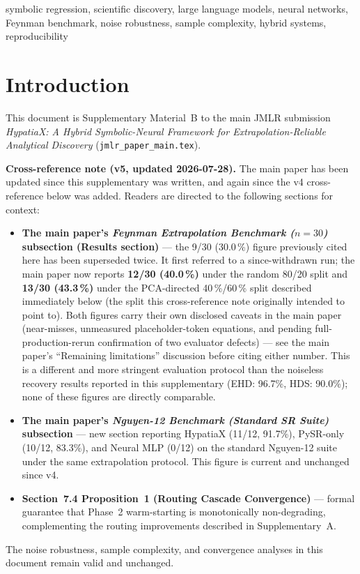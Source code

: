 \documentclass[twoside,11pt]{article}
\begin{document}
\begin{keywords}
symbolic regression, scientific discovery, large language models,
neural networks, Feynman benchmark, noise robustness, sample complexity,
hybrid systems, reproducibility
\end{keywords}

\section{Introduction}
\label{suppb:intro}

This document is Supplementary Material~B to the main JMLR submission
\emph{HypatiaX: A Hybrid Symbolic-Neural Framework for Extrapolation-Reliable
Analytical Discovery} (\texttt{jmlr\_paper\_main.tex}).

\medskip
\noindent\textbf{Cross-reference note (v5, updated 2026-07-28).}
The main paper has been updated since this supplementary was written, and
again since the v4 cross-reference below was added. Readers are directed
to the following sections for context:
\begin{itemize}
  \item \textbf{The main paper's \emph{Feynman Extrapolation Benchmark ($n=30$)} subsection (Results section)} --- the
    9/30 (30.0\,\%) figure previously cited here has been superseded twice.
    It first referred to a since-withdrawn run; the main paper now reports
    \textbf{12/30 (40.0\,\%)} under the random 80/20 split and
    \textbf{13/30 (43.3\,\%)} under the PCA-directed 40\,\%/60\,\% split
    described immediately below (the split this cross-reference note
    originally intended to point to). Both figures carry their own
    disclosed caveats in the main paper (near-misses, unmeasured
    placeholder-token equations, and pending full-production-rerun
    confirmation of two evaluator defects) --- see the main paper's
    ``Remaining limitations'' discussion before citing either number.
    This is a different and more stringent evaluation protocol
    than the noiseless recovery results reported in this supplementary
    (EHD: 96.7\%, HDS: 90.0\%); none of these figures are directly comparable.
  \item \textbf{The main paper's \emph{Nguyen-12 Benchmark (Standard SR Suite)} subsection} --- new section reporting
    HypatiaX (11/12, 91.7\%), PySR-only (10/12, 83.3\%), and Neural MLP
    (0/12) on the standard Nguyen-12 suite under the same extrapolation
    protocol. This figure is current and unchanged since v4.
  \item \textbf{Section~7.4 Proposition~1 (Routing Cascade Convergence)} --- formal
    guarantee that Phase~2 warm-starting is monotonically non-degrading,
    complementing the routing improvements described in Supplementary~A.
\end{itemize}
The noise robustness, sample complexity, and convergence analyses in this
document remain valid and unchanged.
\end{document}
